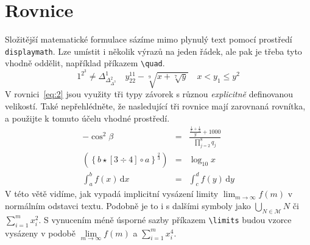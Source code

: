 \documentclass[twocolumn,a4paper,11pt]{article}
\theoremstyle{definition}
\theoremstyle{plain}
\begin{document}
\section{Rovnice}
\label{sec:rovnice}
Složitější matematické formulace sázíme mimo plynulý text pomocí prostředí \verb|displaymath|. Lze umístit i několik výrazů na jeden řádek, ale pak je třeba tyto vhodně oddělit, například příkazem \verb|\quad|.
\[1^{2^3}\neq \Delta^1_{\Delta^2_{\Delta^3}}\quad y^{11}_{22}-\sqrt[9]{x+\sqrt[7]{y}}\quad x < y_1\leq y^2\]
V rovnici~\eqref{eq:2} jsou využity tři typy závorek s různou \emph{explicitně} definovanou velikostí. Také nepřehlédněte, že nasledující tři rovnice mají zarovnaná rovnítka, a použijte k tomuto účelu vhodné prostředí.
\begin{eqnarray}
    \label{eq:1}
    -\cos^2\beta & = & \frac{\frac{\frac{1}{x}+\frac{1}{3}}{y}+1000}{\prod\limits_{j=2}^8 q_j} \\
    \label{eq:2}
    \left(\left\{b\star[3 \div 4]\circ a\right\}^\frac{2}{3}\right) & = & \log_{10} x \\
    \label{eq:3}
    \int_a^b f(x)\,\mathrm{d}x & = & \int_c^d f(y)\,\mathrm{d}y
\end{eqnarray}
V této větě vidíme, jak vypadá implicitní vysázení limity $\lim_{m \to \infty} f(m)$ v normálním odstavci textu. Podobně je to i s dalšími symboly jako $\bigcup_{N\in\mathcal{M}} N$ či $\sum^{m}_{i=1} x^2_i$.
S vynucením méně úsporné sazby příkazem \verb|\limits| budou vzorce vysázeny v podobě $\lim\limits_{m\to \infty} f(m)$ a $\sum\limits_{i=1}^{m} x^{4}_{i}$.
\end{document}
